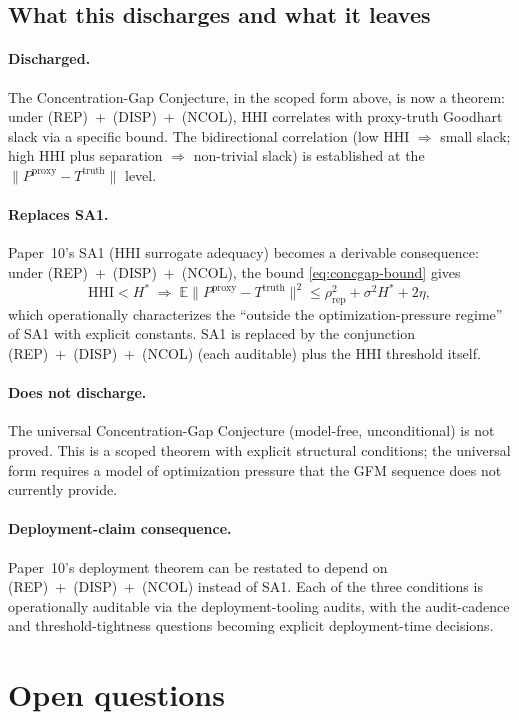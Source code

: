 \documentclass{article}
\newcommand{\HHI}{\mathrm{HHI}}
\newcommand{\Pproxy}{P^{\mathrm{proxy}}}
\newcommand{\Ttruth}{T^{\mathrm{truth}}}
\begin{document}
\subsection{What this discharges and what it leaves}

\paragraph{Discharged.} The Concentration-Gap Conjecture, in the
scoped form above, is now a theorem: under
(REP)~+~(DISP)~+~(NCOL), $\HHI$ correlates with proxy-truth
Goodhart slack via a specific bound.  The bidirectional
correlation (low HHI $\Rightarrow$ small slack; high HHI plus
separation $\Rightarrow$ non-trivial slack) is established at the
$\|\Pproxy - \Ttruth\|$ level.

\paragraph{Replaces SA1.} Paper~10's SA1 (HHI surrogate adequacy)
becomes a derivable consequence: under (REP)~+~(DISP)~+~(NCOL),
the bound \eqref{eq:concgap-bound} gives
\[
  \HHI < H^* \;\Longrightarrow\;
  \mathbb{E}\|\Pproxy - \Ttruth\|^2 \leq \rho_\mathrm{rep}^2 +
  \sigma^2 H^* + 2\eta,
\]
which operationally characterizes the ``outside the
optimization-pressure regime'' of SA1 with explicit constants.
SA1 is replaced by the conjunction (REP)~+~(DISP)~+~(NCOL) (each
auditable) plus the HHI threshold itself.

\paragraph{Does not discharge.} The universal Concentration-Gap
Conjecture (model-free, unconditional) is not proved.  This is a
scoped theorem with explicit structural conditions; the universal
form requires a model of optimization pressure that the GFM
sequence does not currently provide.

\paragraph{Deployment-claim consequence.} Paper~10's deployment
theorem can be restated to depend on
(REP)~+~(DISP)~+~(NCOL) instead of SA1.  Each of the three
conditions is operationally auditable via the deployment-tooling
audits, with the audit-cadence and threshold-tightness questions
becoming explicit deployment-time decisions.

\section{Open questions}
\end{document}
